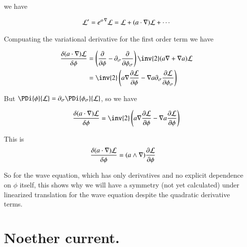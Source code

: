 \documentclass{article}
\begin{document}
we have

\begin{align*}
\mathcal{L}' = e^{a \cdot \nabla} \mathcal{L} = \mathcal{L} + (a \cdot \nabla)\mathcal{L} + \cdots
\end{align*}

Compuating the variational derivative for the first order term we have

\begin{align*}
\frac{\delta (a \cdot \grad) \LL}{\delta \phi} 
&=
\left(\PD{\phi}{} - \partial_\sigma \PD{\phi_\sigma}{} \right) \inv{2}(a \grad + \grad a) \LL \\
&=
\inv{2} \left( a \grad \PD{\phi}{\LL} - \grad a \partial_\sigma \PD{\phi_\sigma}{\LL} \right) \\
\end{align*}

But $\PDi{\phi}{\LL} = \partial_\sigma \PDi{\phi_\sigma}{\LL}$, so we have

\begin{align*}
\frac{\delta (a \cdot \grad) \LL}{\delta \phi} 
&=
\inv{2} \left( a \grad \PD{\phi}{\LL} - \grad a \PD{\phi}{\LL} \right) \\
\end{align*}

This is
\begin{align}
\frac{\delta (a \cdot \nabla) \mathcal{L}}{\delta \phi} 
&= (a \wedge \nabla) \frac{\partial {\mathcal{L}}}{\partial {\phi}}
\end{align}

So for the wave equation, which has only derivatives and no explicit dependence on $\phi$ itself, this 
shows why we will have a symmetry (not yet calculated) under linearized translation for the wave equation despite the quadratic derivative terms.

\section{ Noether current. }



\end{document}
